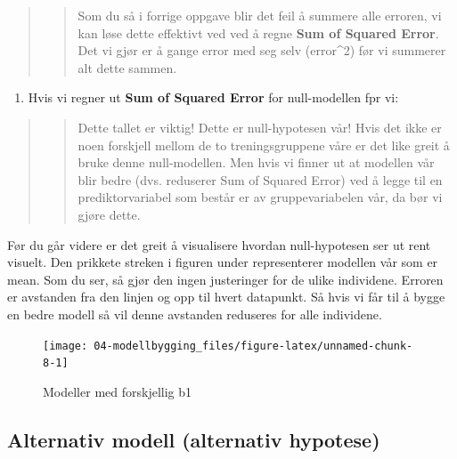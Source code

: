 \documentclass[
]{book}
\providecommand{\tightlist}{%
  \setlength{\itemsep}{0pt}\setlength{\parskip}{0pt}}
\begin{document}
\begin{quote}
\begin{quote}
Som du så i forrige oppgave blir det feil å summere alle erroren, vi kan løse dette effektivt ved ved å regne \textbf{Sum of Squared Error}. Det vi gjør er å gange error med seg selv (error\^{}2) før vi summerer alt dette sammen.
\end{quote}
\end{quote}

\begin{enumerate}
\def\labelenumi{\alph{enumi}.}
\setcounter{enumi}{2}
\tightlist
\item
  Hvis vi regner ut \textbf{Sum of Squared Error} for null-modellen fpr vi:
\end{enumerate}

\begin{quote}
\begin{quote}
Dette tallet er viktig! Dette er null-hypotesen vår! Hvis det ikke er noen forskjell mellom de to treningsgruppene våre er det like greit å bruke denne null-modellen. Men hvis vi finner ut at modellen vår blir bedre (dvs. reduserer Sum of Squared Error) ved å legge til en prediktorvariabel som består er av gruppevariabelen vår, da bør vi gjøre dette.
\end{quote}
\end{quote}

Før du går videre er det greit å visualisere hvordan null-hypotesen ser ut rent visuelt. Den prikkete streken i figuren under representerer modellen vår som er mean. Som du ser, så gjør den ingen justeringer for de ulike individene. Erroren er avstanden fra den linjen og opp til hvert datapunkt. Så hvis vi får til å bygge en bedre modell så vil denne avstanden reduseres for alle individene.

\begin{figure}

{\centering \texttt{[image: 04-modellbygging\_files/figure-latex/unnamed-chunk-8-1]} 

}

\caption{Modeller med forskjellig b1}\label{fig:unnamed-chunk-8}
\end{figure}

\hypertarget{alternativ-modell-alternativ-hypotese}{%
\subsection{Alternativ modell (alternativ hypotese)}\label{alternativ-modell-alternativ-hypotese}}
\end{document}
